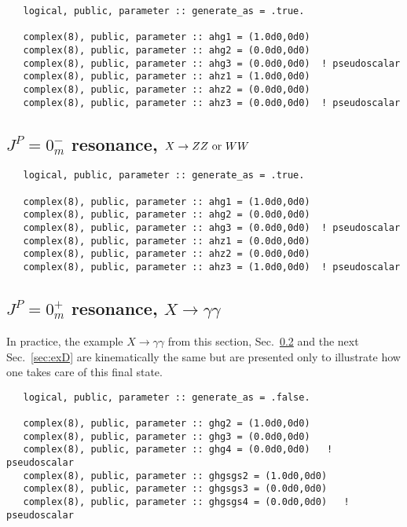 \documentclass[aps,superscriptaddress,nofootinbib]{revtex4}
\begin{document}
\begin{verbatim}
   logical, public, parameter :: generate_as = .true.

   complex(8), public, parameter :: ahg1 = (1.0d0,0d0)
   complex(8), public, parameter :: ahg2 = (0.0d0,0d0)
   complex(8), public, parameter :: ahg3 = (0.0d0,0d0)  ! pseudoscalar
   complex(8), public, parameter :: ahz1 = (1.0d0,0d0)
   complex(8), public, parameter :: ahz2 = (0.0d0,0d0)
   complex(8), public, parameter :: ahz3 = (0.0d0,0d0)  ! pseudoscalar
\end{verbatim}

\subsection{ $J^P = 0^-_m$ resonance, $X \to ZZ~{\rm or}~WW$}
\label{sec:exB}

\begin{verbatim}
   logical, public, parameter :: generate_as = .true.

   complex(8), public, parameter :: ahg1 = (1.0d0,0d0)
   complex(8), public, parameter :: ahg2 = (0.0d0,0d0)
   complex(8), public, parameter :: ahg3 = (0.0d0,0d0)  ! pseudoscalar
   complex(8), public, parameter :: ahz1 = (0.0d0,0d0)
   complex(8), public, parameter :: ahz2 = (0.0d0,0d0)
   complex(8), public, parameter :: ahz3 = (1.0d0,0d0)  ! pseudoscalar
\end{verbatim}

\subsection{ $J^P = 0^+_m$ resonance, $X \to \gamma \gamma$}
\label{sec:exC}

In practice, the example $X \to \gamma \gamma$ from this section, Sec.~\ref{sec:exC} and the next Sec.~\ref{sec:exD} are
kinematically the same but are presented only to illustrate how one takes care of this final state.

\begin{verbatim}
   logical, public, parameter :: generate_as = .false.

   complex(8), public, parameter :: ghg2 = (1.0d0,0d0)
   complex(8), public, parameter :: ghg3 = (0.0d0,0d0)
   complex(8), public, parameter :: ghg4 = (0.0d0,0d0)   ! pseudoscalar
   complex(8), public, parameter :: ghgsgs2 = (1.0d0,0d0)
   complex(8), public, parameter :: ghgsgs3 = (0.0d0,0d0)
   complex(8), public, parameter :: ghgsgs4 = (0.0d0,0d0)   ! pseudoscalar
\end{verbatim}
\end{document}
